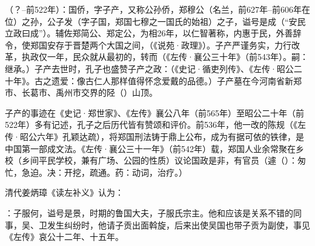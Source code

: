 （？--前522年）：国侨，字子产，又称公孙侨，郑穆公（名兰，前627年--前606年在位）之孙，公子发（字子国，郑国七穆之一国氏的始祖）之子，谥号是成（“安民立政曰成”）。辅佐郑简公、郑定公，为相26年，以仁智著称，内惠于民，外善辞令，使郑国安存于晋楚两个大国之间，（《说苑·政理》）。子产严谨务实，力行改革，执政仅一年，民众就从最初的，转而（《左传·襄公三十年》（前543年）。嗣：继承。）子产去世时，孔子也盛赞子产之政：（《史记·循吏列传》、《左传·昭公二十年》。古之遗爱：像古仁人那样值得怀念爱戴的品德。）子产墓在今河南省新郑市、长葛市、禹州市交界的陉（）山顶。

子产的事迹在《史记·郑世家》、《左传》襄公八年（前565年）至昭公二十年（前522年）多有记述，孔子之后历代皆有赞颂和评价。前536年，他一改的陈规（《左传·昭公六年》孔颖达疏），将郑国刑法铸于鼎上公布，成为有据可依的铁律，是中国第一部成文法。《左传·襄公三十一年》（前542年）载，郑国人业余常聚在乡校（乡间平民学校，兼有广场、公园的性质）议论国政是非，有官员（遽（）：匆忙，急迫。决：开挖，疏通。药：动词，治疗。）

清代姜炳璋《读左补义》认为：

：子服何，谥号是景，时期的鲁国大夫，子服氏宗主。他和应该是关系不错的同事，吴、卫发生纠纷时，他请子贡出面斡旋，后来出使吴国也带子贡为副使，事见《左传》哀公十二年、十五年。

